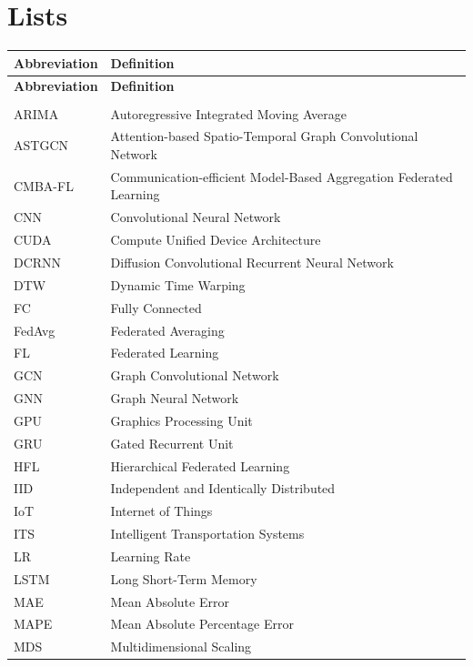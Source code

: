 \appendix
\renewcommand{\appendixtocname}{Appendix}
\renewcommand{\appendixpagename}{\appendixtocname}
\addappheadtotoc
{}
\appendixpage

\chapter{Lists}

\begin{longtable}{@{}p{3cm}p{10cm}@{}}
\textbf{Abbreviation} & \textbf{Definition} \\
\hline
\endfirsthead
\textbf{Abbreviation} & \textbf{Definition} \\
\hline
\endhead
\\[-0.5em]
ARIMA & Autoregressive Integrated Moving Average \\
ASTGCN & Attention-based Spatio-Temporal Graph Convolutional Network \\
CMBA-FL & Communication-efficient Model-Based Aggregation Federated Learning \\
CNN & Convolutional Neural Network \\
CUDA & Compute Unified Device Architecture \\
DCRNN & Diffusion Convolutional Recurrent Neural Network \\
DTW & Dynamic Time Warping \\
FC & Fully Connected \\
FedAvg & Federated Averaging \\
FL & Federated Learning \\
GCN & Graph Convolutional Network \\
GNN & Graph Neural Network \\
GPU & Graphics Processing Unit \\
GRU & Gated Recurrent Unit \\
HFL & Hierarchical Federated Learning \\
IID & Independent and Identically Distributed \\
IoT & Internet of Things \\
ITS & Intelligent Transportation Systems \\
LR & Learning Rate \\
LSTM & Long Short-Term Memory \\
MAE & Mean Absolute Error \\
MAPE & Mean Absolute Percentage Error \\
MDS & Multidimensional Scaling \\

\end{longtable}
